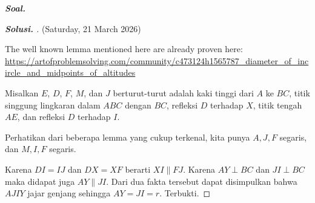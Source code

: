 \textbf{\textit{Soal.}} 
\begin{proof}[\textbf{Solusi. }] (Saturday, 21 March 2026) 
    

    The well known lemma mentioned here are already proven here: \url{https://artofproblemsolving.com/community/c473124h1565787_diameter_of_incircle_and_midpoints_of_altitudes}

    Misalkan $E$, $D$, $F$, $M$, dan $J$ berturut-turut adalah kaki tinggi dari $A$ ke $BC$, titik singgung lingkaran dalam $ABC$ dengan $BC$, refleksi $D$ terhadap $X$, titik tengah $AE$, dan refleksi $D$ terhadap $I$.

    Perhatikan dari beberapa lemma yang cukup terkenal, kita punya $A,J,F$ segaris, dan $M,I,F$ segaris.

    Karena $DI = IJ$ dan $DX = XF$ berarti $XI \parallel FJ$. Karena $AY \perp BC$ dan $JI \perp BC$ maka didapat juga $AY \parallel JI$. Dari dua fakta tersebut dapat disimpulkan bahwa $AJIY$ jajar genjang sehingga $AY = JI = r$. Terbukti.
\end{proof}